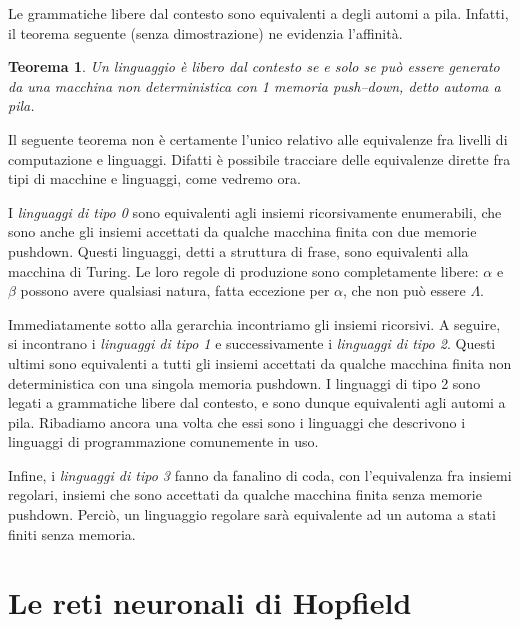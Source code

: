 \documentclass[10pt]{\classname}
\newtheorem{thm}{Teorema}
\theoremstyle{definition}
\theoremstyle{definition}
\theoremstyle{definition}
\theoremstyle{definition}
\begin{document}
Le grammatiche libere dal contesto sono equivalenti a degli automi a pila. Infatti, il teorema seguente (senza dimostrazione) ne evidenzia l'affinità.

\begin{thm}
    Un linguaggio è \emph{libero dal contesto} se e solo se può essere generato
    da una macchina non deterministica con 1 memoria push--down, detto automa a
    pila.
\end{thm}

Il seguente teorema non è certamente l'unico relativo alle equivalenze fra livelli di computazione e linguaggi. Difatti è possibile tracciare delle equivalenze dirette fra tipi di macchine e linguaggi, come vedremo ora.

I \emph{linguaggi di tipo 0} sono equivalenti agli insiemi ricorsivamente enumerabili, che sono anche gli insiemi accettati da qualche macchina finita con due memorie pushdown. Questi linguaggi, detti a struttura di frase, sono equivalenti alla macchina di Turing. Le loro regole di produzione sono completamente libere: $\alpha$ e $\beta$ possono avere qualsiasi natura, fatta eccezione per $\alpha$, che non può essere $\Lambda$.

Immediatamente sotto alla gerarchia incontriamo gli insiemi ricorsivi. A seguire, si incontrano i \emph{linguaggi di tipo 1} e successivamente i \emph{linguaggi di tipo 2}. Questi ultimi sono equivalenti a tutti gli insiemi accettati da qualche macchina finita non deterministica con una singola memoria pushdown. I linguaggi di tipo 2 sono legati a grammatiche libere dal contesto, e sono dunque equivalenti agli automi a pila. Ribadiamo ancora una volta che essi sono i linguaggi che descrivono i linguaggi di programmazione comunemente in uso.

Infine, i \emph{linguaggi di tipo 3} fanno da fanalino di coda, con l'equivalenza fra insiemi regolari, insiemi che sono accettati da qualche macchina finita senza memorie pushdown. Perciò, un linguaggio regolare sarà equivalente ad un automa a stati finiti senza memoria.


\chapter{Le reti neuronali di Hopfield}
\end{document}
